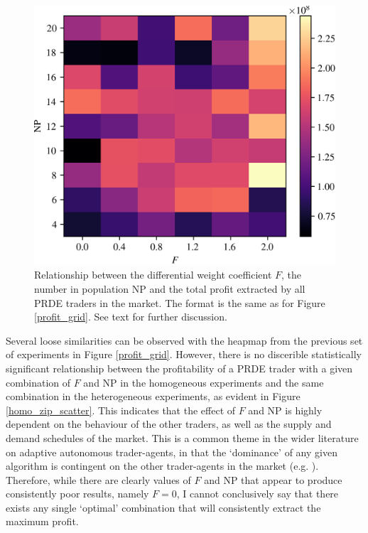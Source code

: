 \documentclass[conference]{IEEEtran}
\begin{document}
\begin{figure}[htbp]
    \centerline{\includegraphics[width=\columnwidth]{zip_profit_grid.png}}
    \caption{
        Relationship between the differential weight coefficient $F$, the number in population $\mathrm{NP}$ and the total profit extracted by all PRDE traders in the market.
        The format is the same as for Figure \ref{profit_grid}.
        See text for further discussion.
    }
    \label{zip_profit_grid}
\end{figure}

Several loose similarities can be observed with the heapmap from the previous set of experiments in Figure \ref{profit_grid}.
However, there is no discerible statistically significant relationship between the profitability of a PRDE trader with a given combination of $F$ and $\mathrm{NP}$ in the homogeneous experiments and the same combination in the heterogeneous experiments, as evident in Figure \ref{homo_zip_scatter}.
This indicates that the effect of $F$ and $\mathrm{NP}$ is highly dependent on the behaviour of the other traders, as well as the supply and demand schedules of the market.
This is a common theme in the wider literature on adaptive autonomous trader-agents, in that the `dominance' of any given algorithm is contingent on the other trader-agents in the market (e.g. \cite{Vach}).
Therefore, while there are clearly values of $F$ and $\mathrm{NP}$ that appear to produce consistently poor results, namely $F=0$, I cannot conclusively say that there exists any single `optimal' combination that will consistently extract the maximum profit.
\end{document}
